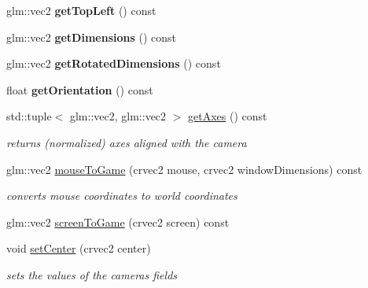 \begin{DoxyCompactItemize}
glm\+::vec2 {\bfseries get\+Top\+Left} () const
\item 
\mbox{\label{classnta_1_1Camera2D_a2f688f531a999d2b427ef63a18859e6d}} 
glm\+::vec2 {\bfseries get\+Dimensions} () const
\item 
\mbox{\label{classnta_1_1Camera2D_a6b3b7c18d66f680c05087b94214bc98f}} 
glm\+::vec2 {\bfseries get\+Rotated\+Dimensions} () const
\item 
\mbox{\label{classnta_1_1Camera2D_a5cf5e5e022f29952af085a63980e737c}} 
float {\bfseries get\+Orientation} () const
\item 
\mbox{\label{classnta_1_1Camera2D_a395b5bfa81b603a3d4e78d6c54aa8212}} 
std\+::tuple$<$ glm\+::vec2, glm\+::vec2 $>$ \hyperlink{classnta_1_1Camera2D_a395b5bfa81b603a3d4e78d6c54aa8212}{get\+Axes} () const
\begin{DoxyCompactList}\small\item\em returns (normalized) axes aligned with the camera \end{DoxyCompactList}\item 
\mbox{\label{classnta_1_1Camera2D_afb20fb9823724babdc8d18b17336169c}} 
glm\+::vec2 \hyperlink{classnta_1_1Camera2D_afb20fb9823724babdc8d18b17336169c}{mouse\+To\+Game} (crvec2 mouse, crvec2 window\+Dimensions) const
\begin{DoxyCompactList}\small\item\em converts mouse coordinates to world coordinates \end{DoxyCompactList}\item 
glm\+::vec2 \hyperlink{classnta_1_1Camera2D_a8b2be32484dee689c6014cf88a6ce80a}{screen\+To\+Game} (crvec2 screen) const
\item 
\mbox{\label{classnta_1_1Camera2D_a11a7edceed0964b375fbfe154b9a9895}} 
void \hyperlink{classnta_1_1Camera2D_a11a7edceed0964b375fbfe154b9a9895}{set\+Center} (crvec2 center)
\begin{DoxyCompactList}\small\item\em sets the values of the camera\textquotesingle{}s fields \end{DoxyCompactList}\item 
\mbox{\label{classnta_1_1Camera2D_a5e887ee36c95789e3455ab2f3bb3f568}} 

\end{DoxyCompactItemize}
